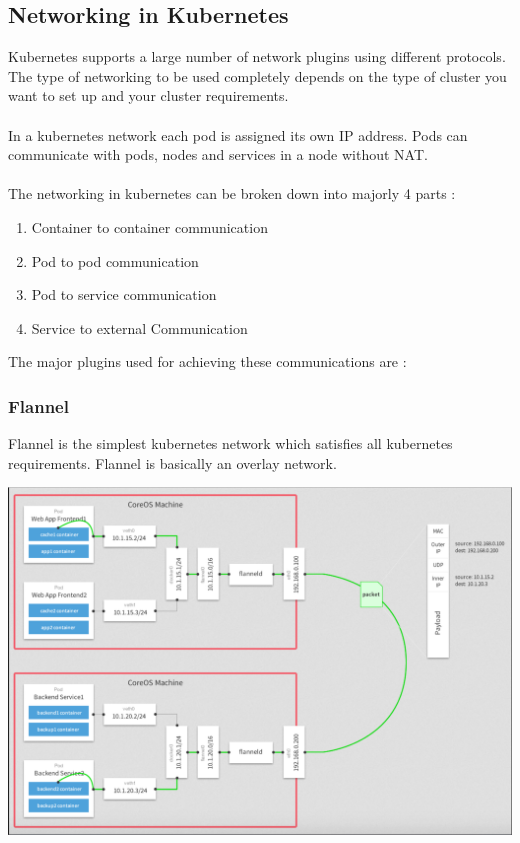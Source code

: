 \documentclass[12pt]{article}
\begin{document}
\subsection{Networking in Kubernetes}
Kubernetes supports a large number of network  plugins using different protocols. The type of networking to be used completely depends on the type of cluster you want to set up and your cluster requirements.\\\\
In a kubernetes network each pod is assigned its own IP address. Pods can communicate with pods, nodes and services in a node without NAT. \\\\
The networking in kubernetes can be broken down into majorly 4 parts :
\begin{enumerate}
	\item Container to container communication
	\item Pod to pod communication
	\item Pod to service communication
	\item Service to external Communication
\end{enumerate}
The major plugins used for achieving these communications are :
\subsubsection{Flannel}
Flannel is the simplest kubernetes network  which satisfies all kubernetes requirements. Flannel is basically an overlay network.
\begin{center}
	\includegraphics[totalheight=0.5\textheight, width=\textwidth]{flannel}
\end{center}
\end{document}

